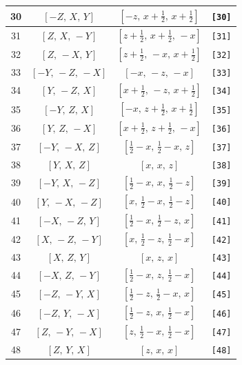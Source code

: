 \documentclass[fleqn,8pt]{jsarticle}
\begin{document}
\begin{longtable}{cccc}
30 & $\left[ - Z,\, X,\, Y \right]$ & $\left[ - z,\, x + \frac{1}{2},\, x + \frac{1}{2} \right]$ & {\tt [30]} \\ \hline
31 & $\left[ Z,\, X,\, - Y \right]$ & $\left[ z + \frac{1}{2},\, x + \frac{1}{2},\, - x \right]$ & {\tt [31]} \\ \hline
32 & $\left[ Z,\, - X,\, Y \right]$ & $\left[ z + \frac{1}{2},\, - x,\, x + \frac{1}{2} \right]$ & {\tt [32]} \\ \hline
33 & $\left[ - Y,\, - Z,\, - X \right]$ & $\left[ - x,\, - z,\, - x \right]$ & {\tt [33]} \\ \hline
34 & $\left[ Y,\, - Z,\, X \right]$ & $\left[ x + \frac{1}{2},\, - z,\, x + \frac{1}{2} \right]$ & {\tt [34]} \\ \hline
35 & $\left[ - Y,\, Z,\, X \right]$ & $\left[ - x,\, z + \frac{1}{2},\, x + \frac{1}{2} \right]$ & {\tt [35]} \\ \hline
36 & $\left[ Y,\, Z,\, - X \right]$ & $\left[ x + \frac{1}{2},\, z + \frac{1}{2},\, - x \right]$ & {\tt [36]} \\ \hline
37 & $\left[ - Y,\, - X,\, Z \right]$ & $\left[ \frac{1}{2} - x,\, \frac{1}{2} - x,\, z \right]$ & {\tt [37]} \\ \hline
38 & $\left[ Y,\, X,\, Z \right]$ & $\left[ x,\, x,\, z \right]$ & {\tt [38]} \\ \hline
39 & $\left[ - Y,\, X,\, - Z \right]$ & $\left[ \frac{1}{2} - x,\, x,\, \frac{1}{2} - z \right]$ & {\tt [39]} \\ \hline
40 & $\left[ Y,\, - X,\, - Z \right]$ & $\left[ x,\, \frac{1}{2} - x,\, \frac{1}{2} - z \right]$ & {\tt [40]} \\ \hline
41 & $\left[ - X,\, - Z,\, Y \right]$ & $\left[ \frac{1}{2} - x,\, \frac{1}{2} - z,\, x \right]$ & {\tt [41]} \\ \hline
42 & $\left[ X,\, - Z,\, - Y \right]$ & $\left[ x,\, \frac{1}{2} - z,\, \frac{1}{2} - x \right]$ & {\tt [42]} \\ \hline
43 & $\left[ X,\, Z,\, Y \right]$ & $\left[ x,\, z,\, x \right]$ & {\tt [43]} \\ \hline
44 & $\left[ - X,\, Z,\, - Y \right]$ & $\left[ \frac{1}{2} - x,\, z,\, \frac{1}{2} - x \right]$ & {\tt [44]} \\ \hline
45 & $\left[ - Z,\, - Y,\, X \right]$ & $\left[ \frac{1}{2} - z,\, \frac{1}{2} - x,\, x \right]$ & {\tt [45]} \\ \hline
46 & $\left[ - Z,\, Y,\, - X \right]$ & $\left[ \frac{1}{2} - z,\, x,\, \frac{1}{2} - x \right]$ & {\tt [46]} \\ \hline
47 & $\left[ Z,\, - Y,\, - X \right]$ & $\left[ z,\, \frac{1}{2} - x,\, \frac{1}{2} - x \right]$ & {\tt [47]} \\ \hline
48 & $\left[ Z,\, Y,\, X \right]$ & $\left[ z,\, x,\, x \right]$ & {\tt [48]} \\
\end{longtable}
\end{document}
